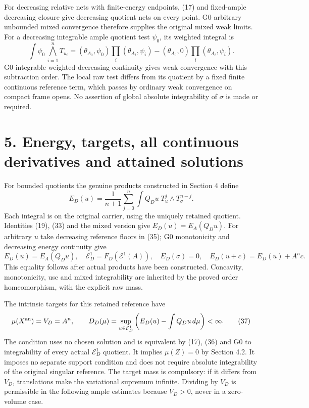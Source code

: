 \documentclass[
  10pt,
]{article}
\begin{document}
For decreasing relative nets with finite-energy endpoints, (17) and
fixed-ample decreasing closure give decreasing quotient nets on every
point. G0 arbitrary unbounded mixed convergence therefore supplies the
original mixed weak limits. For a decreasing integrable ample quotient
test \(\psi_0\), its weighted integral is
\[\int\psi_0\,\bigwedge_{i=1}^n T_{u_i}
=(\theta_{A_0},\psi_0)\prod_i(\theta_{A_i},\psi_i)
 -(\theta_{A_0},0)\prod_i(\theta_{A_i},\psi_i).\tag{34}\] G0 integrable
weighted decreasing continuity gives weak convergence with this
subtraction order. The local raw test differs from its quotient by a
fixed finite continuous reference term, which passes by ordinary weak
convergence on compact frame opens. No assertion of global absolute
integrability of \(\sigma\) is made or required.

\section{5. Energy, targets, all continuous derivatives and attained
solutions}\label{energy-targets-all-continuous-derivatives-and-attained-solutions}

For bounded quotients the genuine products constructed in Section 4
define
\[E_D(u)=\frac1{n+1}\sum_{j=0}^n\int Q_Du\;T_u^j\wedge T_\sigma^{n-j}.\tag{35}\]
Each integral is on the original carrier, using the uniquely retained
quotient. Identities (19), (33) and the mixed version give
\(E_D(u)=E_A(Q_Du)\). For arbitrary \(u\) take decreasing reference
floors in (35); G0 monotonicity and decreasing energy continuity give
\[E_D(u)=E_A(Q_Du),\quad
\mathcal E_D^1=F_D(\mathcal E^1(A)),\quad E_D(\sigma)=0,
\quad E_D(u+c)=E_D(u)+A^n c.\tag{36}\] This equality follows after
actual products have been constructed. Concavity, monotonicity, usc and
mixed integrability are inherited by the proved order homeomorphism,
with the explicit raw mass.

The intrinsic targets for this retained reference have
\[\mu(X^{\rm an})=V_D=A^n,\qquad
D_D(\mu)=\sup_{u\in\mathcal E_D^1}\left(E_D(u)-\int Q_Du\,d\mu\right)<\infty.\tag{37}\]
The condition uses no chosen solution and is equivalent by (17), (36)
and G0 to integrability of every actual \(\mathcal E_D^1\) quotient. It
implies \(\mu(Z)=0\) by Section 4.2. It imposes no separate support
condition and does not require absolute integrability of the original
singular reference. The target mass is compulsory: if it differs from
\(V_D\), translations make the variational supremum infinite. Dividing
by \(V_D\) is permissible in the following ample estimates because
\(V_D>0\), never in a zero-volume case.
\end{document}

